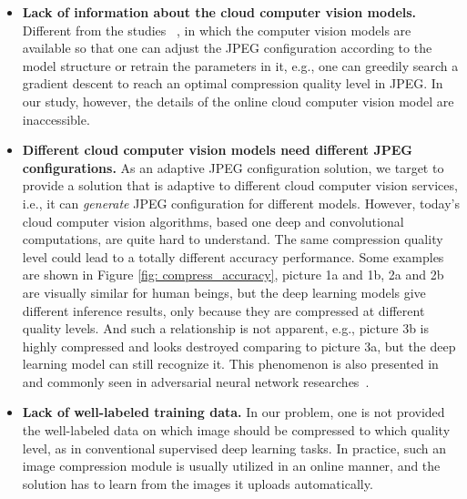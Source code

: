 \begin{itemize}
\item \textbf{Lack of information about the cloud computer vision models.} Different from the studies ~\cite{DeepN-JPEG,torfason2018towards,gueguen2018faster}, in which the computer vision models are available so that one can adjust the JPEG configuration according to the model structure or retrain the parameters in it, e.g., one can greedily search a gradient descent to reach an optimal compression quality level in JPEG. In our study, however, the details of the online cloud computer vision model are inaccessible. %

\item \textbf{Different cloud computer vision models need different JPEG configurations.} As an adaptive JPEG configuration solution, we target to provide a solution that is adaptive to different cloud computer vision services, i.e., it can \emph{generate} JPEG configuration for different models. However, today's cloud computer vision algorithms, based one deep and convolutional computations, are quite hard to understand. The same compression quality level could lead to a totally different accuracy performance. Some examples are shown in Figure \ref{fig: compress_accuracy}, picture 1a and 1b, 2a and 2b are visually similar for human beings, but the deep learning models give different inference results, only because they are compressed at different quality levels. And such a relationship is not apparent, e.g., picture 3b is highly compressed and looks destroyed comparing to picture 3a, but the deep learning model can still recognize it. This phenomenon is also presented in~\cite{delac2005effects} and commonly seen in adversarial neural network researches~\cite{yuan2019adversarial, evtimov2018robust}. %

\item \textbf{Lack of well-labeled training data.} In our problem, one is not provided the well-labeled data on which image should be compressed to which quality level, as in conventional supervised deep learning tasks. In practice, such an image compression module is usually utilized in an online manner, and the solution has to learn from the images it uploads automatically. 
\end{itemize} 

